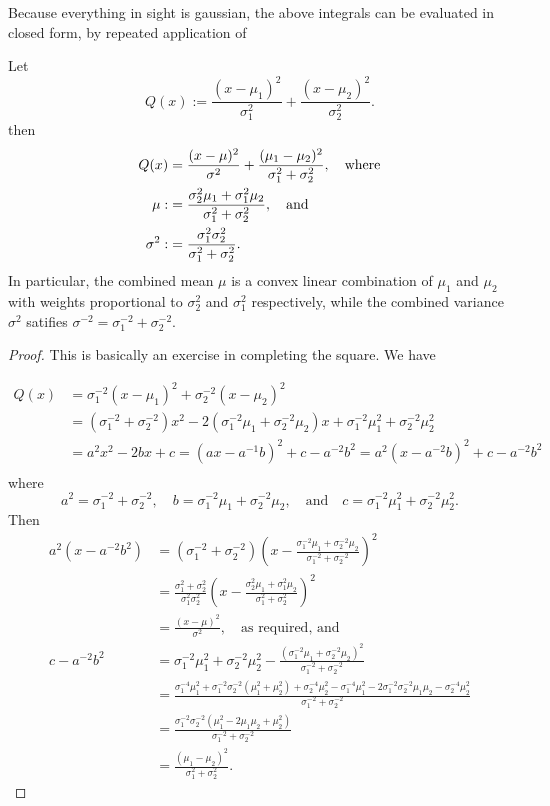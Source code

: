 \documentclass[12pt,leqno]{article}
\begin{document}
Because everything in sight is gaussian, the above integrals can be evaluated in closed form, by repeated application of

\begin{Lem}\label{comp_sq}
  Let
  $$
  Q(x) := \frac{(x-\mu_1)^2}{\sigma_1^2} + \frac{(x-\mu_2)^2}{\sigma_2^2}.
  $$
  then
\begin{align}
    Q(x) &= \frac{(x-\mu)^2}{\sigma^2} + \frac{(\mu_1-\mu_2)^2}{\sigma_1^2+\sigma_2^2},\quad\text{where}\notag\\
    \mu :&= \frac{\sigma_2^2\mu_1 + \sigma_1^2\mu_2}{\sigma_1^2+\sigma_2^2},\quad\text{and}\label{cs:mu}\\
    \sigma^2 :&= \frac{\sigma_1^2\sigma_2^2}{\sigma_1^2+\sigma_2^2}.\label{cs:sigma}
\end{align}
In particular, the combined mean $\mu$ is a convex linear combination of $\mu_1$ and $\mu_2$ with weights proportional to $\sigma_2^2$ and $\sigma_1^2$ respectively, while the combined variance $\sigma^2$ satifies $\sigma^{-2} = \sigma_1^{-2} + \sigma_2^{-2}$.
\end{Lem}
  \begin{proof}
    This is basically an exercise in completing the square.  We have

\begin{align*}
  Q(x) &= \sigma_1^{-2}(x-\mu_1)^2 + \sigma_2^{-2}(x-\mu_2)^2\\
  &= (\sigma_1^{-2}+\sigma_2^{-2})x^2 - 2(\sigma_1^{-2}\mu_1+\sigma_2^{-2}\mu_2)x + \sigma_1^{-2}\mu_1^2+\sigma_2^{-2}\mu_2^2\\
  &= a^2x^2 -2bx +c = (ax-a^{-1}b)^2 + c - a^{-2}b^2 = a^2(x-a^{-2}b)^2 + c - a^{-2}b^2 \\
\end{align*}
where
$$
a^2 = \sigma_1^{-2} + \sigma_2^{-2},\quad b = \sigma_1^{-2}\mu_1 + \sigma_2^{-2}\mu_2,\quad\text{and}\quad
c = \sigma_1^{-2}\mu_1^2+\sigma_2^{-2}\mu_2^2.
$$
Then
\begin{align*}
  a^2(x-a^{-2}b^2) &= (\sigma_1^{-2}+\sigma_2^{-2})\left(x - \frac{\sigma_1^{-2}\mu_1+\sigma_2^{-2}\mu_2}{\sigma_1^{-2}+\sigma_2^{-2}}\right)^2 \\
  &= \frac{\sigma_1^2 +\sigma_2^2}{\sigma_1^2\sigma_2^2}\left(x - \frac{\sigma_2^2\mu_1+\sigma_1^2\mu_2}{\sigma_1^2+\sigma_2^2}\right)^2\\
  &= \frac{(x-\mu)^2}{\sigma^2},\quad\text{as required, and}\\
  c-a^{-2}{b^2} &= \sigma_1^{-2}\mu_1^2+\sigma_2^{-2}\mu_2^2 - \frac{(\sigma_1^{-2}\mu_1 + \sigma_2^{-2}\mu_2)^2}
  {\sigma_1^{-2}+\sigma_2^{-2}} \\
  &=\frac{\sigma_1^{-4}\mu_1^2+\sigma_1^{-2}\sigma_2^{-2}(\mu_1^2+\mu_2^2)+\sigma_2^{-4}\mu_2^2 -
    \sigma_1^{-4}\mu_1^2 - 2\sigma_1^{-2}\sigma_2^{-2}\mu_1\mu_2 -\sigma_2^{-4}\mu_2^2}{\sigma_1^{-2}+\sigma_2^{-2}}\\
  &= \frac{\sigma_1^{-2}\sigma_2^{-2}(\mu_1^2 - 2\mu_1\mu_2+\mu_2^2)}{\sigma_1^{-2}+\sigma_2^{-2}} \\
  &= \frac{(\mu_1-\mu_2)^2}{\sigma_1^2+\sigma_2^2}.
  \end{align*}
  \end{proof}
\end{document}
